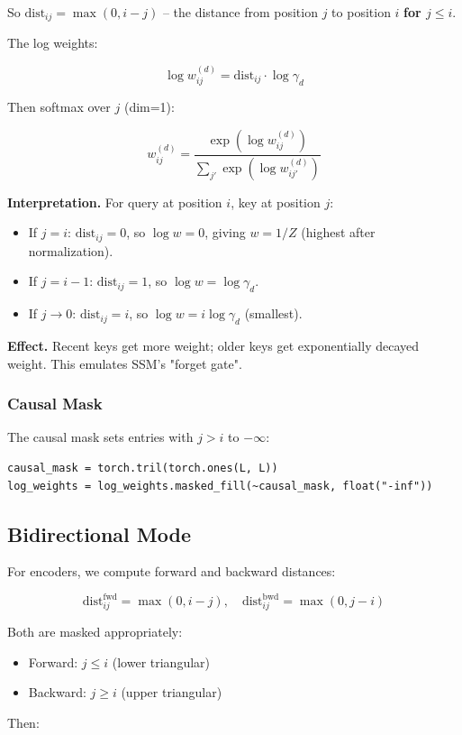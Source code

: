 So $\text{dist}_{ij} = \max(0, i - j)$ -- the distance from position $j$ to 
position $i$ \textbf{for $j \leq i$}.

The log weights:

\[
\log w_{ij}^{(d)} = \text{dist}_{ij} \cdot \log \gamma_d
\tag{4.6}
\]

Then softmax over $j$ (dim=1):

\[
w_{ij}^{(d)} = \frac{\exp(\log w_{ij}^{(d)})}{\sum_{j'} \exp(\log w_{ij'}^{(d)})}
\tag{4.7}
\]

\textbf{Interpretation.} For query at position $i$, key at position $j$:

\begin{itemize}
\item If $j = i$: $\text{dist}_{ij} = 0$, so $\log w = 0$, giving $w = 1/Z$
  (highest after normalization).
\item If $j = i - 1$: $\text{dist}_{ij} = 1$, so $\log w = \log \gamma_d$.
\item If $j \to 0$: $\text{dist}_{ij} = i$, so $\log w = i \log \gamma_d$
  (smallest).

\end{itemize}
\textbf{Effect.} Recent keys get more weight; older keys get exponentially 
decayed weight. This emulates SSM's "forget gate".

\subsubsection{Causal Mask}

The causal mask sets entries with $j > i$ to $-\infty$:

\begin{lstlisting}
causal_mask = torch.tril(torch.ones(L, L))
log_weights = log_weights.masked_fill(~causal_mask, float("-inf"))
\end{lstlisting}

\subsection{Bidirectional Mode}

For encoders, we compute forward and backward distances:

\[
\text{dist}^\text{fwd}_{ij} = \max(0, i - j), \quad
\text{dist}^\text{bwd}_{ij} = \max(0, j - i)
\tag{4.8}
\]

Both are masked appropriately:

\begin{itemize}
\item Forward: $j \leq i$ (lower triangular)
\item Backward: $j \geq i$ (upper triangular)

\end{itemize}
Then:

